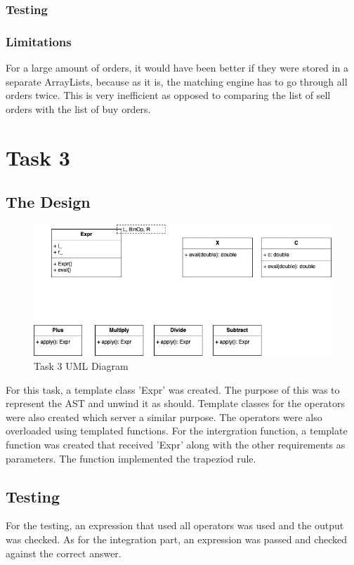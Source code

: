 \documentclass[a4paper, 12pt]{report}
\begin{document}
\subsubsection{Testing}

\subsubsection{Limitations}
For a large amount of orders, it would have been better if they were stored in a separate ArrayLists, because as it is, the matching engine has to go through all orders twice. This is very inefficient as opposed to comparing the list of sell orders with the list of buy orders.

\section{Task 3}

\subsection{The Design}

\begin{figure}[H]
    \centering
    \includegraphics[width=1\textwidth]{"UML 3"}
    \caption{Task 3 UML Diagram}
\end{figure}

For this task, a template class  'Expr' was created. The purpose of this was to represent the AST and unwind it as should. Template classes for the operators were also created which server a similar purpose. The operators were also overloaded using templated functions.
\linebreak
For the intergration function, a template function was created that received 'Expr' along with the other requirements as parameters. The function implemented the trapeziod rule.

\subsection{Testing}

For the testing, an expression that used all operators was used and the output was checked. As for the integration part, an expression was passed and checked against the correct answer.
\end{document}
